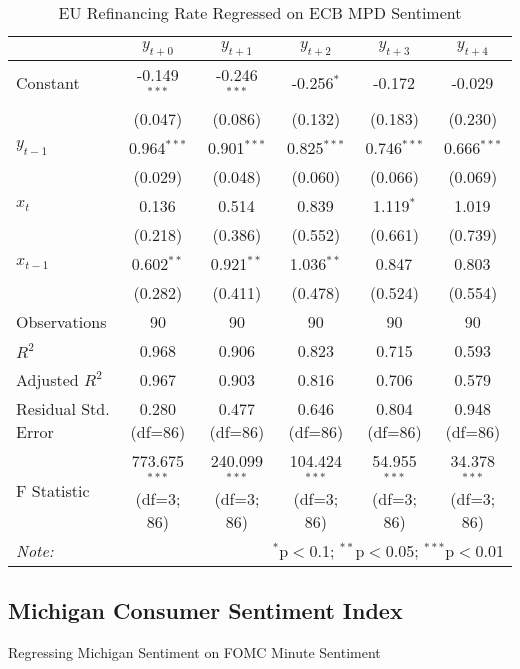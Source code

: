 \documentclass [12pt]{article}
\begin{document}
\begin{table}[H] \centering
  \caption{EU Refinancing Rate Regressed on ECB MPD Sentiment}
  \begin{adjustbox}{width=\textwidth}
\begin{tabular}{lccccc}
\hline
\hline
 & $y_{t+0}$ & $y_{t+1}$ & $y_{t+2}$ & $y_{t+3}$ & $y_{t+4}$  \\
\hline
 Constant & -0.149$^{***}$ & -0.246$^{***}$ & -0.256$^{*}$ & -0.172$^{}$ & -0.029$^{}$ \\
& (0.047) & (0.086) & (0.132) & (0.183) & (0.230) \\
 $y_{t-1}$ & 0.964$^{***}$ & 0.901$^{***}$ & 0.825$^{***}$ & 0.746$^{***}$ & 0.666$^{***}$ \\
& (0.029) & (0.048) & (0.060) & (0.066) & (0.069) \\
 $x_{t}$ & 0.136$^{}$ & 0.514$^{}$ & 0.839$^{}$ & 1.119$^{*}$ & 1.019$^{}$ \\
& (0.218) & (0.386) & (0.552) & (0.661) & (0.739) \\
 $x_{t-1}$ & 0.602$^{**}$ & 0.921$^{**}$ & 1.036$^{**}$ & 0.847$^{}$ & 0.803$^{}$ \\
& (0.282) & (0.411) & (0.478) & (0.524) & (0.554) \\
\hline
 Observations & 90 & 90 & 90 & 90 & 90 \\
 $R^2$ & 0.968 & 0.906 & 0.823 & 0.715 & 0.593 \\
 Adjusted $R^2$ & 0.967 & 0.903 & 0.816 & 0.706 & 0.579 \\
 Residual Std. Error & 0.280 (df=86) & 0.477 (df=86) & 0.646 (df=86) & 0.804 (df=86) & 0.948 (df=86) \\
 F Statistic & 773.675$^{***}$ (df=3; 86) & 240.099$^{***}$ (df=3; 86) & 104.424$^{***}$ (df=3; 86) & 54.955$^{***}$ (df=3; 86) & 34.378$^{***}$ (df=3; 86) \\
\hline
\hline
\textit{Note:} & \multicolumn{5}{r}{$^{*}$p$<$0.1; $^{**}$p$<$0.05; $^{***}$p$<$0.01} \\
\end{tabular}
\end{adjustbox}
\end{table}

\subsection{Michigan Consumer Sentiment Index}

Regressing Michigan Sentiment on FOMC Minute Sentiment
\end{document}
